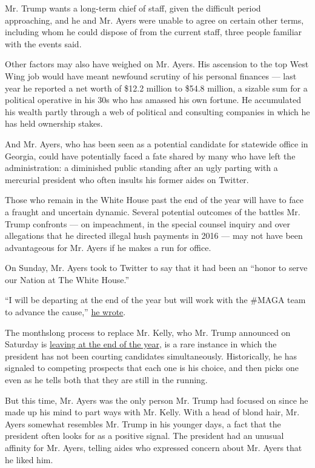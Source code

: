 Mr. Trump wants a long-term chief of staff, given the difficult period
approaching, and he and Mr. Ayers were unable to agree on certain other
terms, including whom he could dispose of from the current staff, three
people familiar with the events said.

Other factors may also have weighed on Mr. Ayers. His ascension to the
top West Wing job would have meant newfound scrutiny of his personal
finances --- last year he reported a net worth of \$12.2 million to
\$54.8 million, a sizable sum for a political operative in his 30s who
has amassed his own fortune. He accumulated his wealth partly through a
web of political and consulting companies in which he has held ownership
stakes.

And Mr. Ayers, who has been seen as a potential candidate for statewide
office in Georgia, could have potentially faced a fate shared by many
who have left the administration: a diminished public standing after an
ugly parting with a mercurial president who often insults his former
aides on Twitter.

Those who remain in the White House past the end of the year will have
to face a fraught and uncertain dynamic. Several potential outcomes of
the battles Mr. Trump confronts --- on impeachment, in the special
counsel inquiry and over allegations that he directed illegal hush
payments in 2016 --- may not have been advantageous for Mr. Ayers if he
makes a run for office.

On Sunday, Mr. Ayers took to Twitter to say that it had been an ``honor
to serve our Nation at The White House.''

``I will be departing at the end of the year but will work with the
\#MAGA team to advance the cause,''
\href{https://twitter.com/nick_ayers/status/1071879332283453440}{he
wrote}.

The monthslong process to replace Mr. Kelly, who Mr. Trump announced on
Saturday is
\href{https://www.nytimes.com/2018/12/08/us/politics/john-kelly-chief-staff-trump.html}{leaving
at the end of the year}, is a rare instance in which the president has
not been courting candidates simultaneously. Historically, he has
signaled to competing prospects that each one is his choice, and then
picks one even as he tells both that they are still in the running.

But this time, Mr. Ayers was the only person Mr. Trump had focused on
since he made up his mind to part ways with Mr. Kelly. With a head of
blond hair, Mr. Ayers somewhat resembles Mr. Trump in his younger days,
a fact that the president often looks for as a positive signal. The
president had an unusual affinity for Mr. Ayers, telling aides who
expressed concern about Mr. Ayers that he liked him.

